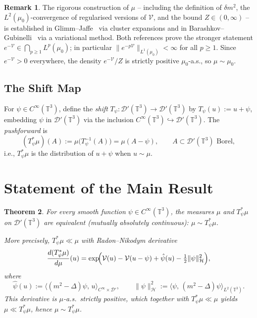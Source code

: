 \documentclass[11pt,a4paper]{article}
\theoremstyle{plain}
\newtheorem{theorem}{Theorem}[section]
\theoremstyle{definition}
\newtheorem{remark}[theorem]{Remark}
\newcommand{\T}{\mathbb{T}}
\newcommand{\cD}{\mathcal{D}}
\newcommand{\cH}{\mathcal{H}}
\newcommand{\cV}{\mathcal{V}}
\newcommand{\ip}[2]{\langle #1,\,#2\rangle}
\newcommand{\norm}[1]{\|#1\|}
\begin{document}
\begin{remark}\label{rem:construction}
The rigorous construction of $\mu$ -- including the definition of $\delta m^2$, the
$L^2(\mu_0)$-convergence of regularised versions of $\cV$, and the bound $Z\in(0,\infty)$
-- is established in Glimm--Jaffe~\cite{GJ87} via cluster expansions and in
Barashkov--Gubinelli~\cite{BG20} via a variational method.  Both references prove the
stronger statement $e^{-\cV}\in\bigcap_{p\ge 1}L^p(\mu_0)$; in particular
$\norm{e^{-p\cV}}_{L^1(\mu_0)}<\infty$ for all $p\ge 1$.  Since $e^{-\cV}>0$ everywhere,
the density $e^{-\cV}/Z$ is strictly positive $\mu_0$-a.s., so $\mu\sim\mu_0$.
\end{remark}

\subsection{The Shift Map}

For $\psi\in C^\infty(\T^3)$, define the \emph{shift} $T_\psi:\cD'(\T^3)\to\cD'(\T^3)$ by
$T_\psi(u) := u + \psi$, embedding $\psi$ in $\cD'(\T^3)$ via the inclusion
$C^\infty(\T^3)\hookrightarrow\cD'(\T^3)$.  The \emph{pushforward} is
\[
  (T_\psi^*\mu)(A) := \mu\bigl(T_\psi^{-1}(A)\bigr) = \mu(A-\psi),
  \qquad A \subset \cD'(\T^3)\text{ Borel},
\]
i.e., $T_\psi^*\mu$ is the distribution of $u+\psi$ when $u\sim\mu$.

\section{Statement of the Main Result}

\begin{theorem}\label{thm:main}
For every smooth function $\psi\in C^\infty(\T^3)$, the measures $\mu$ and $T_\psi^*\mu$
on $\cD'(\T^3)$ are equivalent (mutually absolutely continuous): $\mu \sim T_\psi^*\mu$.

More precisely, $T_\psi^*\mu \ll \mu$ with Radon--Nikodym derivative
\begin{equation}\label{eq:RN}
  \frac{d(T_\psi^*\mu)}{d\mu}(u)
  = \exp\!\Bigl(\cV(u) - \cV(u-\psi) + \hat{\psi}(u) - \tfrac{1}{2}\norm{\psi}_{\cH}^2\Bigr),
\end{equation}
where
\begin{equation}\label{eq:hatpsi}
  \hat{\psi}(u) := \ip{(m^2-\Delta)\psi}{u}_{C^\infty\times\cD'},
  \qquad
  \norm{\psi}_{\cH}^2 := \ip{\psi}{(m^2-\Delta)\psi}_{L^2(\T^3)}.
\end{equation}
This derivative is $\mu$-a.s.\ strictly positive, which together with $T_\psi^*\mu\ll\mu$
yields $\mu \ll T_\psi^*\mu$, hence $\mu \sim T_\psi^*\mu$.
\end{theorem}
\end{document}
